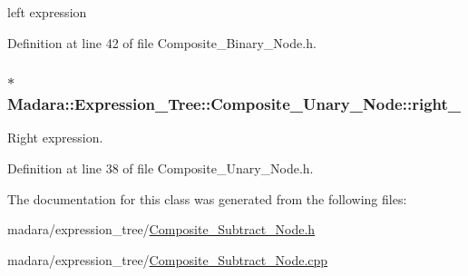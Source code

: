 left expression 



Definition at line 42 of file Composite\_\-Binary\_\-Node.h.

\hypertarget{classMadara_1_1Expression__Tree_1_1Composite__Unary__Node_a077b7bd1b52df6f5c6adfde735556a68}{
\subsubsection[{right\_\-}]{$\ast$ {\bf Madara::Expression\_\-Tree::Composite\_\-Unary\_\-Node::right\_\-}}}
\label{d3/dc7/classMadara_1_1Expression__Tree_1_1Composite__Unary__Node_a077b7bd1b52df6f5c6adfde735556a68}


Right expression. 



Definition at line 38 of file Composite\_\-Unary\_\-Node.h.



The documentation for this class was generated from the following files:\begin{DoxyCompactItemize}
\item 
madara/expression\_\-tree/\hyperlink{Composite__Subtract__Node_8h}{Composite\_\-Subtract\_\-Node.h}\item 
madara/expression\_\-tree/\hyperlink{Composite__Subtract__Node_8cpp}{Composite\_\-Subtract\_\-Node.cpp}\end{DoxyCompactItemize}
